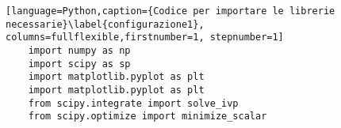 \begin{lstlisting}[language=Python,caption={Codice per importare le librerie necessarie}\label{configurazione1}, columns=fullflexible,firstnumber=1, stepnumber=1]
    import numpy as np
    import scipy as sp
    import matplotlib.pyplot as plt
    import matplotlib.pyplot as plt
    from scipy.integrate import solve_ivp
    from scipy.optimize import minimize_scalar
\end{lstlisting}